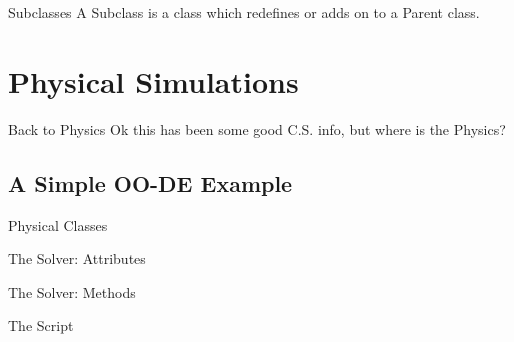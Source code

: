 \documentclass[mathserif]{beamer}
\providecommand{\inputcode}[1]{
  \begin{block}{}
    \scriptsize{}
  \end{block}
}
\begin{document}
\begin{frame}{Subclasses}
  A \alert{Subclass} is a class which redefines or adds on to a \alert{Parent} class. 

  \inputcode{examples/student}
\end{frame}

\section{Physical Simulations}

\begin{frame}{Back to Physics}
  Ok this has been some good C.S. info, but where is the Physics?
\end{frame}

\subsection{A Simple OO-DE Example}

\begin{frame}{Physical Classes}
  \inputcode{code/class0}
\end{frame}

\begin{frame}{The Solver: Attributes}
  \inputcode{code/class1}
\end{frame}

\begin{frame}{The Solver: Methods}
  \inputcode{code/class2}
\end{frame}

\begin{frame}{The Script}
  \begin{columns}
    \begin{column}{0.49\linewidth}
      \inputcode{code/example1}
    \end{column}
    \begin{column}{0.49\linewidth}
      \inputcode{code/example2}
      \vspace{4mm}
      \centering
    \end{column}
  \end{columns}
\end{frame}
\end{document}
